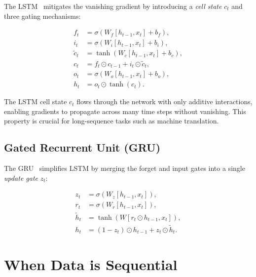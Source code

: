 \documentclass[12pt,a4paper]{article}
\begin{document}
The LSTM~\cite{hochreiter1997long} mitigates the vanishing gradient by
introducing a \emph{cell state} $c_t$ and three gating mechanisms:

\begin{align}
  f_t   &= \sigma\!\left(W_f[h_{t-1}, x_t] + b_f\right),   \label{eq:lstm_f} \\
  i_t   &= \sigma\!\left(W_i[h_{t-1}, x_t] + b_i\right),   \label{eq:lstm_i} \\
  \tilde{c}_t &= \tanh\!\left(W_c[h_{t-1}, x_t] + b_c\right), \label{eq:lstm_c_tilde} \\
  c_t   &= f_t \odot c_{t-1} + i_t \odot \tilde{c}_t,       \label{eq:lstm_c} \\
  o_t   &= \sigma\!\left(W_o[h_{t-1}, x_t] + b_o\right),   \label{eq:lstm_o} \\
  h_t   &= o_t \odot \tanh(c_t).                            \label{eq:lstm_h}
\end{align}

\begin{keyinsight}
  The LSTM cell state $c_t$ flows through the network with only additive
  interactions, enabling gradients to propagate across many time steps without
  vanishing.  This property is crucial for long-sequence tasks such as machine
  translation.
\end{keyinsight}

\subsection{Gated Recurrent Unit (GRU)}
\label{subsec:gru}

The GRU~\cite{cho2014learning} simplifies LSTM by merging the forget and input
gates into a single \emph{update gate} $z_t$:

\begin{align}
  z_t &= \sigma\!\left(W_z[h_{t-1}, x_t]\right), \label{eq:gru_z} \\
  r_t &= \sigma\!\left(W_r[h_{t-1}, x_t]\right), \label{eq:gru_r} \\
  \tilde{h}_t &= \tanh\!\left(W[r_t \odot h_{t-1}, x_t]\right), \label{eq:gru_h_tilde} \\
  h_t &= (1 - z_t) \odot h_{t-1} + z_t \odot \tilde{h}_t. \label{eq:gru_h}
\end{align}

\section{When Data is Sequential}
\label{sec:sequential}
\end{document}
